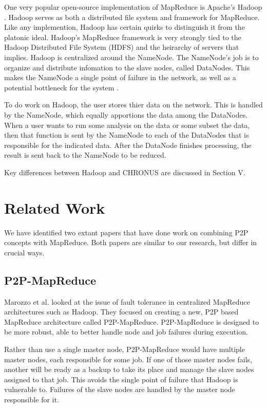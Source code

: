 \documentclass[conference, compsocconf, letterpaper]{IEEEtran}
\begin{document}
One very popular open-source implementation of MapReduce is Apache's Hadoop \cite{Hadoop}.  Hadoop serves as both a distributed file system and framework for MapReduce\cite{shvachko2010hadoop}.  Like any implemention, Hadoop has certain quirks to distinguish it from the platonic ideal.  Hadoop's MapReduce framework is very strongly tied to the Hadoop Distributed File System (HDFS) and the heirarchy of servers that implies.  Hadoop is centralized around the NameNode.  The NameNode's job is to organize and distribute infomation to the slave nodes, called DataNodes.  This makes the NameNode a single point of failure \cite{shvachko2010hadoop} in the network, as well as a potential bottleneck for the system \cite{hadoop-bottle}.

To do work on Hadoop, the user stores thier data on the network.  This is handled by the NameNode, which equally apportions the data among the DataNodes.  When a user wants to run some analysis on the data or some subset the data, then that function is sent by the NameNode to each of the DataNodes that is responsible for the indicated data.   After the DataNode finishes processing, the result is sent back to the NameNode to be reduced.

Key differences between Hadoop and CHRONUS are discussed in Section V.


\section{Related Work}

We have identified two extant papers that have done work on combining P2P concepts with MapReduce.  Both papers are similar to our research, but differ in crucial ways.

\subsection{P2P-MapReduce}
Marozzo et al. \cite{marozzo2012p2p} looked at the issue of fault tolerance in centralized MapReduce architectures such as Hadoop.  They focused on creating a new, P2P based MapReduce architecture called P2P-MapReduce.  P2P-MapReduce is designed to be more robust, able to better handle node and job failures during execution.

Rather than use a single master node, P2P-MapReduce would have multiple master nodes, each responsible for some job.  If one of those master nodes fails, another will be ready as a backup to take its place and manage the slave nodes assigned to that job.  This avoids the single point of failure that Hadoop is vulnerable to. Failures of the slave nodes are handled by the master node responsible for it.
\end{document}
